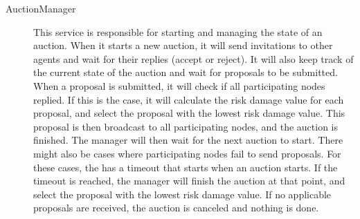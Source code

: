 \begin{description}
    \item[AuctionManager] This service is responsible for starting and managing the state of an auction. When it starts a new auction, it will send invitations to other agents and wait for their replies (accept or reject). It will also keep track of the current state of the auction and wait for proposals to be submitted. When a proposal is submitted, it will check if all participating nodes replied. If this is the case, it will calculate the risk damage value for each proposal, and select the proposal with the lowest risk damage value. This proposal is then broadcast to all participating nodes, and the auction is finished. The manager will then wait for the next auction to start. There might also be cases where participating nodes fail to send proposals. For these cases, the  has a timeout that starts when an auction starts. If the timeout is reached, the manager will finish the auction at that point, and select the proposal with the lowest risk damage value. If no applicable proposals are received, the auction is canceled and nothing is done.
\end{description}



